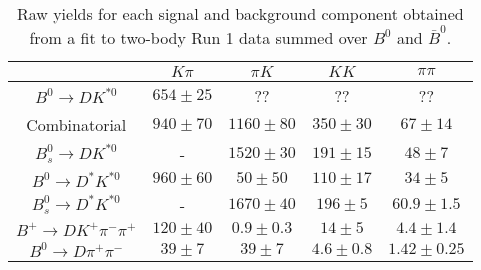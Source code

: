 \begin{table}
  \centering
  \begin{tabular}{ccccc}
      \toprule
       & $K\pi$ & $\pi K$ & $KK$ & $\pi\pi$ \\
      \midrule
      $B^0 \to DK^{*0}$ & $654 \pm 25$ & ?? & ?? & ?? \\
      Combinatorial & $940 \pm 70$ & $1160 \pm 80$ & $350 \pm 30$ & $67 \pm 14$ \\
      $B^0_s \to DK^{*0}$ & \-- & $1520 \pm 30$ & $191 \pm 15$ & $48 \pm 7$ \\
      $B^0 \to D^*K^{*0}$ & $960 \pm 60$ & $50 \pm 50$ & $110 \pm 17$ & $34 \pm 5$ \\
      $B^0_s \to D^*K^{*0}$ & \-- & $1670 \pm 40$ & $196 \pm 5$ & $60.9 \pm 1.5$ \\
      $B^+ \to DK^+\pi^-\pi^+$ & $120 \pm 40$ & $0.9 \pm 0.3$ & $14 \pm 5$ & $4.4 \pm 1.4$ \\
      $B^0 \to D\pi^+\pi^-$ & $39 \pm 7$ & $39 \pm 7$ & $4.6 \pm 0.8$ & $1.42 \pm 0.25$ \\
      \bottomrule
      \end{tabular}
  \caption{Raw yields for each signal and background component obtained from a fit to two-body Run 1 data summed over $B^0$ and $\bar{B}^0$.}
\label{tab:yields_combined_2body_run1}
\end{table}
